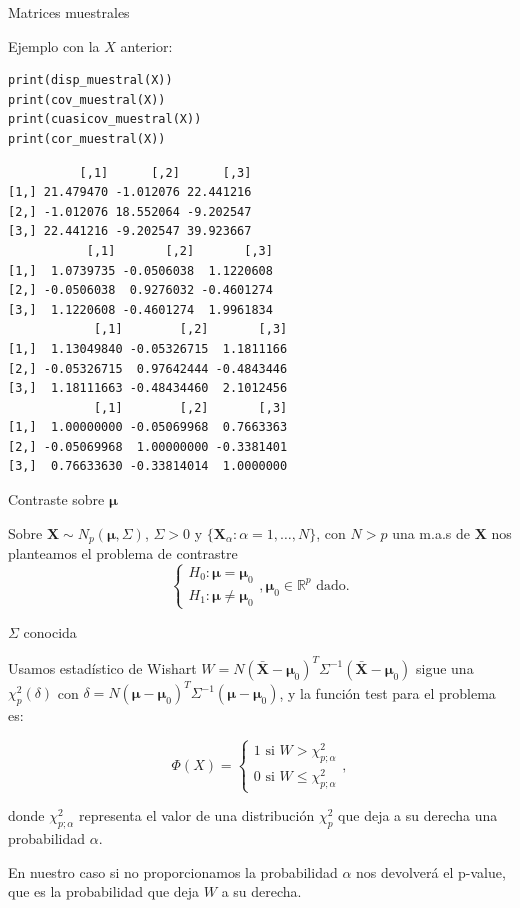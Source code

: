 \documentclass[xcolor=table]{beamer}
\begin{document}
\begin{frame}[fragile]{Matrices muestrales}

Ejemplo con la $X$ anterior:

\small
\begin{lstlisting}
print(disp_muestral(X))
print(cov_muestral(X))
print(cuasicov_muestral(X))
print(cor_muestral(X))
\end{lstlisting}

\scriptsize
\begin{lstlisting}
          [,1]      [,2]      [,3]
[1,] 21.479470 -1.012076 22.441216
[2,] -1.012076 18.552064 -9.202547
[3,] 22.441216 -9.202547 39.923667
           [,1]       [,2]       [,3]
[1,]  1.0739735 -0.0506038  1.1220608
[2,] -0.0506038  0.9276032 -0.4601274
[3,]  1.1220608 -0.4601274  1.9961834
            [,1]        [,2]       [,3]
[1,]  1.13049840 -0.05326715  1.1811166
[2,] -0.05326715  0.97642444 -0.4843446
[3,]  1.18111663 -0.48434460  2.1012456
            [,1]        [,2]       [,3]
[1,]  1.00000000 -0.05069968  0.7663363
[2,] -0.05069968  1.00000000 -0.3381401
[3,]  0.76633630 -0.33814014  1.0000000
\end{lstlisting}
\end{frame}

\begin{frame}[fragile]{Contraste sobre $\pmb{\mu}$}

Sobre $\pmb{X} \sim N_p(\pmb{\mu}, \Sigma)$, $\Sigma>0$ y $\{\pmb{X}_{\alpha} : \alpha = 1, \ldots, N\}$, con $N > p$ una m.a.s de $\pmb{X}$ nos planteamos el problema de contrastre $$\begin{cases} H_0 : \pmb{\mu} = \pmb{\mu}_0 \\ H_1: \pmb{\mu} \neq \pmb{\mu}_0 \end{cases}, \pmb{\mu}_0 \in \mathbb{R}^p \text{ dado.} $$
\end{frame}

\begin{frame}[fragile]{$\Sigma$ conocida}

Usamos estadístico de Wishart $W = N (\pmb{\bar{X}} - \pmb{\mu}_0)^T \Sigma^{-1} (\pmb{\bar{X}} - \pmb{\mu}_0) $ sigue una $\chi^2_p(\delta)$ con $\delta = N (\pmb{\mu} - \pmb{\mu}_0)^T \Sigma^{-1} (\pmb{\mu} - \pmb{\mu}_0)$, y la función test para el problema es:

$$ \Phi(X) = \begin{cases} 1 \text{ si } W > \chi^2_{p;\alpha} \\ 0 \text{ si } W \leq \chi^2_{p;\alpha} \end{cases}, $$

donde $\chi^2_{p;\alpha}$ representa el valor de una distribución $\chi^2_p$ que deja a su derecha una probabilidad $\alpha$.

En nuestro caso si no proporcionamos la probabilidad $\alpha$ nos devolverá el p-value, que es la probabilidad que deja $W$ a su derecha.

\end{frame}
\end{document}
